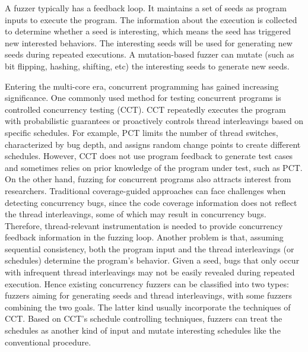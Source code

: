 
A fuzzer typically has a feedback loop. It maintains a set of seeds as program inputs to execute the program. The information about the execution is collected to determine whether a seed is interesting, which means the seed has triggered new interested behaviors. The interesting seeds will be used for generating new seeds during repeated executions. A mutation-based fuzzer can mutate (such as bit flipping, hashing, shifting, etc) the interesting seeds to generate new seeds. 



Entering the multi-core era, concurrent programming has gained increasing significance.
One commonly used method for testing concurrent programs is controlled concurrency testing (CCT). CCT repeatedly executes the program with probabilistic guarantees or proactively controls thread interleavings based on specific schedules. For example, PCT\cite{pct} limits the number of thread switches, characterized by bug depth, and assigns random change points to create different schedules. However, CCT does not use program feedback to generate test cases and sometimes relies on prior knowledge of the program under test, such as PCT.
On the other hand, fuzzing for concurrent programs also attracts interest from researchers. Traditional coverage-guided approaches can face challenges when detecting concurrency bugs, since the code coverage information does not reflect the thread interleavings, some of which may result in concurrency bugs. Therefore, thread-relevant instrumentation is needed to provide concurrency feedback information in the fuzzing loop. Another problem is that, assuming sequential consistency, both the program input and the thread interleavings (or schedules) determine the program's behavior. Given a seed, bugs that only occur with infrequent thread interleavings may not be easily revealed during repeated execution. Hence existing concurrency fuzzers can be classified into two types: fuzzers aiming for generating seeds\cite{muzz} and thread interleavings\cite{rff, conzzer}, with some fuzzers combining the two goals. The latter kind usually incorporate the techniques of CCT.  Based on CCT's schedule controlling techniques, fuzzers can treat the schedules as another kind of input and mutate interesting schedules like the conventional procedure. 

